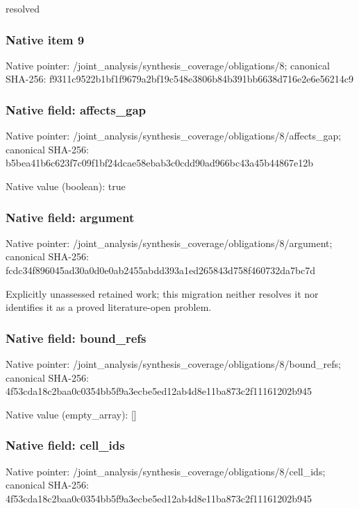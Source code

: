 \documentclass[10pt,a4paper]{article}
\begin{document}
\begingroup\raggedright\sloppy resolved\par\endgroup

\subsubsection{Native item 9}
Native pointer: /joint\_\allowbreak{}analysis/synthesis\_\allowbreak{}coverage/obligations/8; canonical SHA-256: f9311c9522b1bf1f9679a2bf19c548e3806b84b391bb6638d716e2e6e56214c9

\subsubsection{Native field: affects\_\allowbreak{}gap}
Native pointer: /joint\_\allowbreak{}analysis/synthesis\_\allowbreak{}coverage/obligations/8/affects\_\allowbreak{}gap; canonical SHA-256: b5bea41b6c623f7c09f1bf24dcae58ebab3c0cdd90ad966bc43a45b44867e12b

Native value (boolean): true

\subsubsection{Native field: argument}
Native pointer: /joint\_\allowbreak{}analysis/synthesis\_\allowbreak{}coverage/obligations/8/argument; canonical SHA-256: fcdc34f896045ad30a0d0e0ab2455abdd393a1ed265843d758f460732da7bc7d

\begingroup\raggedright\sloppy Explicitly unassessed retained work;\allowbreak{} this migration neither resolves it nor identifies it as a proved literature-open problem.\par\endgroup

\subsubsection{Native field: bound\_\allowbreak{}refs}
Native pointer: /joint\_\allowbreak{}analysis/synthesis\_\allowbreak{}coverage/obligations/8/bound\_\allowbreak{}refs; canonical SHA-256: 4f53cda18c2baa0c0354bb5f9a3ecbe5ed12ab4d8e11ba873c2f11161202b945

Native value (empty\_\allowbreak{}array): []

\subsubsection{Native field: cell\_\allowbreak{}ids}
Native pointer: /joint\_\allowbreak{}analysis/synthesis\_\allowbreak{}coverage/obligations/8/cell\_\allowbreak{}ids; canonical SHA-256: 4f53cda18c2baa0c0354bb5f9a3ecbe5ed12ab4d8e11ba873c2f11161202b945
\end{document}
